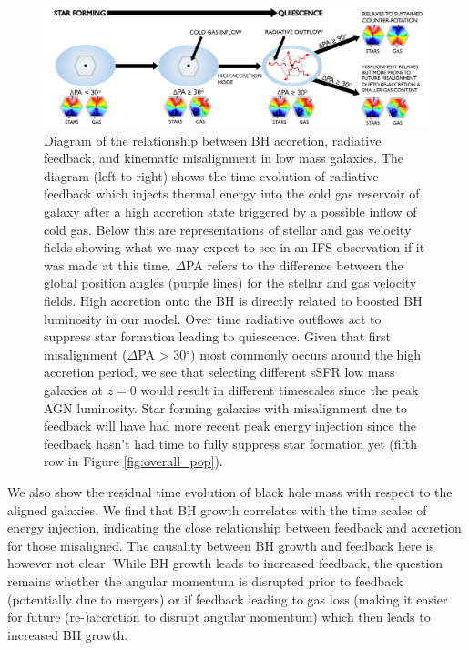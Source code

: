 \documentclass[fleqn,usenatbib]{mnras}
\begin{document}
\begin{figure}
	\includegraphics[width=0.9\linewidth]{quasar_mode_feedback_compressed.pdf}
    \caption{Diagram of the relationship between BH accretion, radiative feedback, and kinematic misalignment in low mass galaxies. The diagram (left to right) shows the time evolution of radiative feedback which injects thermal energy into the cold gas reservoir of galaxy after a high accretion state triggered by a possible inflow of cold gas. Below this are representations of stellar and gas velocity fields showing what we may expect to see in an IFS observation if it was made at this time. $\Delta$PA refers to the difference between the global position angles (purple lines) for the stellar and gas velocity fields. High accretion onto the BH is directly related to boosted BH luminosity in our model. Over time radiative outflows act to suppress star formation leading to quiescence. Given that first misalignment ($\Delta$PA > 30$^{\circ}$) most commonly occurs around the high accretion period, we see that selecting different sSFR low mass galaxies at $z=0$ would result in different timescales since the peak AGN luminosity. Star forming galaxies with misalignment due to feedback will have had more recent peak energy injection since the feedback hasn't had time to fully suppress star formation yet (fifth row in Figure \ref{fig:overall_pop}).}
    \label{fig:diagram}
\end{figure}

We also show the residual time evolution of black hole mass with respect to the aligned galaxies. We find that BH growth correlates with the time scales of energy injection, indicating the close relationship between feedback and accretion for those misaligned. The causality between BH growth and feedback here is however not clear. While BH growth leads to increased feedback, the question remains whether the angular momentum is disrupted prior to feedback (potentially due to mergers) or if feedback leading to gas loss (making it easier for future (re-)accretion to disrupt angular momentum) which then leads to increased BH growth.
\end{document}
